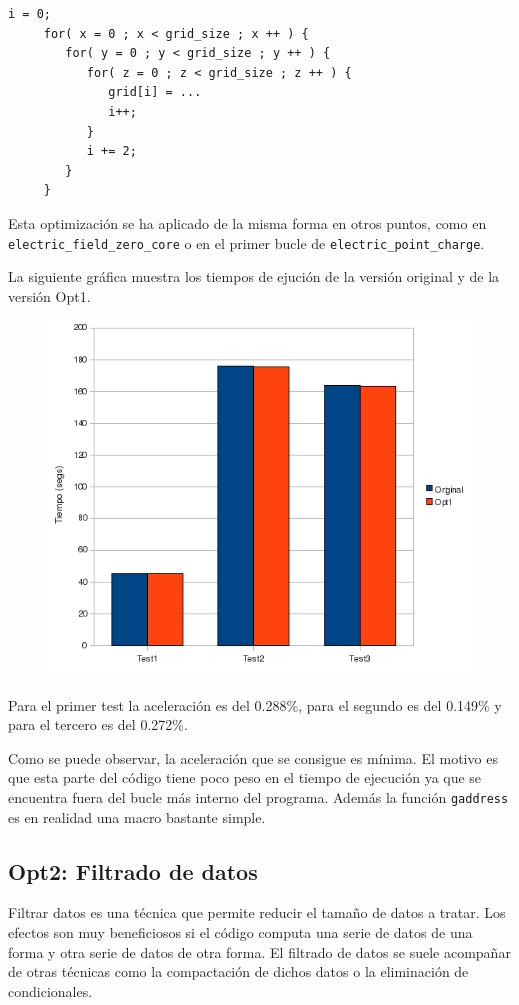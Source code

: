 \begin{lstlisting}[]
     i = 0;
     for( x = 0 ; x < grid_size ; x ++ ) {
        for( y = 0 ; y < grid_size ; y ++ ) {
           for( z = 0 ; z < grid_size ; z ++ ) {
              grid[i] = ...
              i++;
           }
           i += 2;
        }
     }
\end{lstlisting}

Esta optimizaci\'{o}n se ha aplicado de la misma forma en otros puntos, como en
\texttt{electric\_field\_zero\_core} o en el primer bucle de
\texttt{electric\_point\_charge}.

La siguiente gr\'{a}fica muestra los tiempos de ejuci\'{o}n de la versi\'{o}n
original y de la versi\'{o}n Opt1.

\begin{figure}[ht]
   \centering
   \includegraphics[keepaspectratio=true,width=.5\textwidth]{figures/opt1-perf}
\end{figure}

Para el primer test la aceleraci\'{o}n es del 0.288\%, para el segundo es del
0.149\% y para el tercero es del 0.272\%.

Como se puede observar, la aceleraci\'{o}n que se consigue es m\'{i}nima. El
motivo es que esta parte del c\'{o}digo tiene poco peso en el tiempo de
ejecuci\'{o}n ya que se encuentra fuera del bucle m\'{a}s interno del programa.
Adem\'{a}s la funci\'{o}n \texttt{gaddress} es en realidad una macro bastante
simple.

\subsection{Opt2: Filtrado de datos}

Filtrar datos es una t\'{e}cnica que permite reducir el tama\~{n}o de datos a
tratar. Los efectos son muy beneficiosos si el c\'{o}digo computa una serie de
datos de una forma y otra serie de datos de otra forma. El filtrado de datos se
suele acompa\~{n}ar de otras t\'{e}cnicas como la compactaci\'{o}n de dichos
datos o la eliminaci\'{o}n de condicionales.

